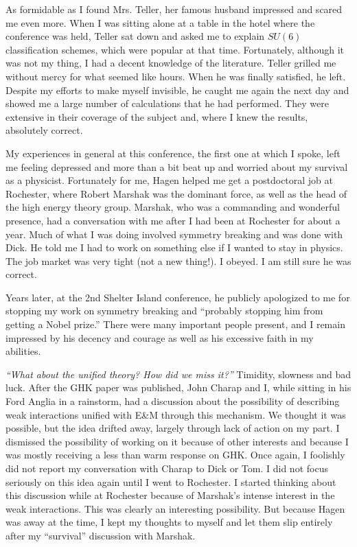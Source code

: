 \documentclass[12pt]{article}
\begin{document}
   As formidable as I found Mrs. Teller, her famous husband impressed and
   scared me even more. When I was sitting alone at a table in the hotel where
   the conference was held, Teller sat down and asked me to explain $SU(6)$
   classification schemes, which were popular at that time. Fortunately,
   although it was not my thing, I had a decent knowledge of the
   literature. Teller grilled me without mercy for what seemed like
   hours. When he was finally satisfied, he left.  Despite my efforts to make
   myself invisible, he caught me again the next day and showed me a large
   number of calculations that he had performed. They were extensive in their
   coverage of the subject and, where I knew the results, absolutely correct.

   My experiences in general at this conference, the first one at which I
   spoke, left me feeling depressed and more than a bit beat up and worried
   about my survival as a physicist. Fortunately for me, Hagen helped me
   get a postdoctoral job at Rochester, where Robert Marshak was the dominant
   force, as well as the head of the high energy theory group.  Marshak, who
   was a commanding and wonderful presence, had a conversation
   with me after I had been at Rochester for about a year. Much of what I was
   doing involved symmetry breaking and was done with Dick. He told me I had
   to work on something else if I wanted to stay in physics.  The job market
   was very tight (not a new thing!).  I obeyed. I am still sure he was
   correct.

   Years later, at the 2nd Shelter Island conference, he publicly apologized to
   me for stopping my work on symmetry breaking and ``probably stopping him
   from getting a Nobel prize.'' There were many important people present, and
   I remain impressed by his decency and courage as well as his excessive
   faith in my abilities.

   \emph{``What about the unified theory? How did we miss it?''} Timidity,
   slowness and bad luck. After the GHK paper was published, John Charap and
   I, while sitting in his Ford Anglia in a rainstorm, had a discussion about
   the possibility of describing weak interactions unified with E\&M through
   this mechanism. We thought it was possible, but the idea drifted away,
   largely through lack of action on my part.  I dismissed the possibility of
   working on it because of other interests and because I was mostly receiving
   a less than warm response on GHK. Once again, I foolishly did not report my
   conversation with Charap to Dick or Tom. I did not focus seriously on
   this idea again until I went to Rochester. I started thinking about this
   discussion while at Rochester because of Marshak's intense interest
   in the weak interactions. This was clearly an interesting possibility. But
   because Hagen was away at the time, I kept my thoughts to myself and let
   them slip entirely after my ``survival'' discussion with Marshak.
\end{document}
